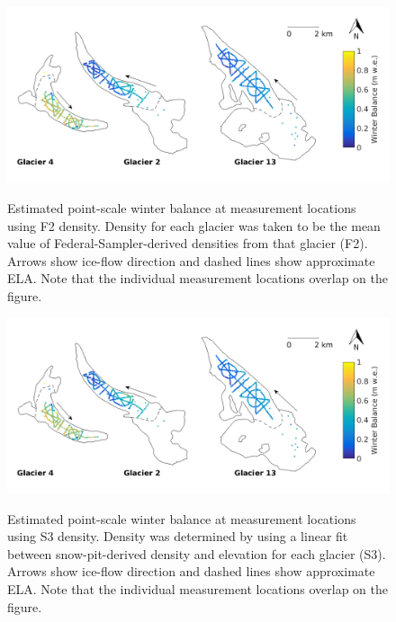 \documentclass{sfuthesis}
\begin{document}
{\begin{figure}[H]
	\centering
	\includegraphics[width = \textwidth]{SWEmap_opt5.png}\\
	\caption[Estimated point-scale winter balance at measurement locations using F2 density]{Estimated point-scale winter balance at measurement locations using F2 density. Density for each glacier was taken to be the mean value of Federal-Sampler-derived densities from that glacier (F2). Arrows show ice-flow direction and dashed lines show approximate ELA. Note that the individual measurement locations overlap on the figure.}
	\label{fig:SWEmap_F2}
\end{figure}

\begin{figure}[H]
	\centering
	\includegraphics[width = \textwidth]{SWEmap_opt6.png}\\
	\caption[Estimated point-scale winter balance at measurement locations using S3 density]{Estimated point-scale winter balance at measurement locations using S3 density. Density was determined by using a linear fit between snow-pit-derived density and elevation for each glacier (S3). Arrows show ice-flow direction and dashed lines show approximate ELA. Note that the individual measurement locations overlap on the figure.}
	\label{fig:SWEmap_S3}
\end{figure}

}
\end{document}
